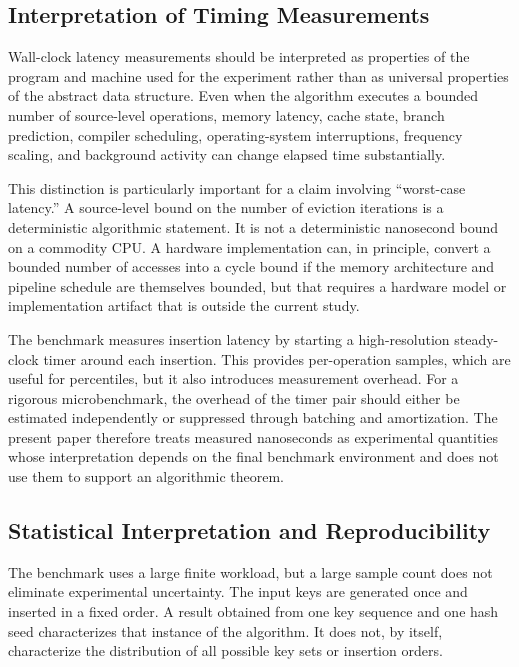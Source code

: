\documentclass[conference]{IEEEtran}
\begin{document}
\subsection{Interpretation of Timing Measurements}
\label{subsec:discussion_timing}

Wall-clock latency measurements should be interpreted as properties of the
program and machine used for the experiment rather than as universal properties
of the abstract data structure. Even when the algorithm executes a bounded
number of source-level operations, memory latency, cache state, branch
prediction, compiler scheduling, operating-system interruptions, frequency
scaling, and background activity can change elapsed time substantially.

This distinction is particularly important for a claim involving ``worst-case
latency.'' A source-level bound on the number of eviction iterations is a
deterministic algorithmic statement. It is not a deterministic nanosecond
bound on a commodity CPU. A hardware implementation can, in principle, convert
a bounded number of accesses into a cycle bound if the memory architecture and
pipeline schedule are themselves bounded, but that requires a hardware model
or implementation artifact that is outside the current study.

The benchmark measures insertion latency by starting a high-resolution
steady-clock timer around each insertion. This provides per-operation samples,
which are useful for percentiles, but it also introduces measurement overhead.
For a rigorous microbenchmark, the overhead of the timer pair should either be
estimated independently or suppressed through batching and amortization. The
present paper therefore treats measured nanoseconds as experimental quantities
whose interpretation depends on the final benchmark environment and does not
use them to support an algorithmic theorem.

\subsection{Statistical Interpretation and Reproducibility}
\label{subsec:discussion_statistics}

The benchmark uses a large finite workload, but a large sample count does not
eliminate experimental uncertainty. The input keys are generated once and
inserted in a fixed order. A result obtained from one key sequence and one
hash seed characterizes that instance of the algorithm. It does not, by itself,
characterize the distribution of all possible key sets or insertion orders.
\end{document}
